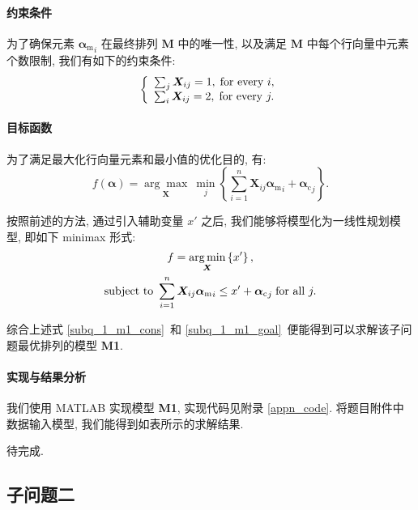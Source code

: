 \documentclass[]{ctexart}
\begin{document}
\paragraph{约束条件} 为了确保元素 ${\bm{\alpha}_{\mathrm{m}}}_i$ 在最终排列 $\bm{M}$ 中的唯一性, 以及满足 $\bm{M}$ 中每个行向量中元素个数限制, 我们有如下的约束条件:
\begin{equation}
    \left\{
    \begin{array}{ll}
        \sum_{j} \bm{X}_{ij} = 1, \thickspace \text{for every}\ i,\\
        \sum_{i} \bm{X}_{ij} = 2, \thickspace \text{for every}\ j.\\
    \end{array}
    \right.
    \label{subq_1_m1_cons}
\end{equation}

\paragraph{目标函数} 为了满足最大化行向量元素和最小值的优化目的, 有:
\begin{equation}
    f(\bm{\alpha}) = \underset{\bm{X}}{\arg\max}\ \underset{j}{\min} \left\{\sum_{i=1}^{n} \bm{X}_{ij}{\bm{\alpha}_{\mathrm{m}}}_{i}+{\bm{\alpha}_{\mathrm{c}}}_j\right\}.
    \label{subq_1_m1_goal}
\end{equation}

按照前述的方法, 通过引入辅助变量 $x'$ 之后, 我们能够将模型化为一线性规划模型, 即如下 minimax 形式:
\begin{gather*}
f = \underset{\bm{X}}{\arg\min} \left\{x'\right\}, \\
\text{subject to}\ \sum_{i=1}^{n} \bm{X}_{ij}{\bm{\alpha}_{\mathrm{m}}}_{i} \le x' + {\bm{\alpha}_{\mathrm{c}}}_j \thickspace \text{for all}\ j.
\end{gather*}

综合上述式 \eqref{subq_1_m1_cons}\ 和 \eqref{subq_1_m1_goal}\ 便能得到可以求解该子问题最优排列的模型 \textbf{M1}.

\paragraph{实现与结果分析}

我们使用 MATLAB 实现模型 \textbf{M1}, 实现代码见附录 \ref{appn_code}. 将题目附件中数据输入模型, 我们能得到如表所示的求解结果.

待完成.

\subsection{子问题二} \label{subq_2}
\end{document}
